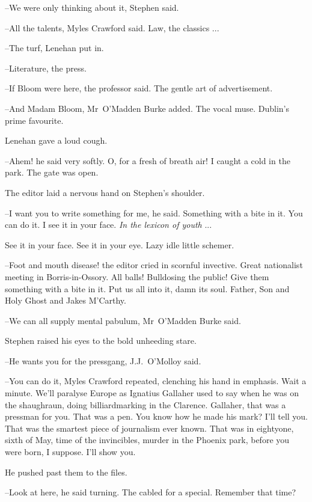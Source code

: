 --We were only thinking about it,
Stephen said.

--All the talents,
Myles Crawford said.
Law,
the classics ...

--The turf,
Lenehan put in.

--Literature,
the press.

--If Bloom were here,
the professor said.
The gentle art of advertisement.

--And Madam Bloom,
Mr~O'Madden Burke added.
The vocal muse.
Dublin's prime favourite.

Lenehan gave a loud cough.

--Ahem!
he said very softly.
O, for a fresh of breath air!
I caught a cold in the park.
The gate was open.



The editor laid a nervous hand on Stephen's shoulder.

--I want you to write something for me,
he said.
Something with a bite in it.
You can do it.
I see it in your face.
\emph{In the lexicon of youth} ...

See it in your face.
See it in your eye.
Lazy idle little schemer.

--Foot and mouth disease!
the editor cried in scornful invective.
Great nationalist meeting in Borris-in-Ossory.
All balls!
Bulldosing the public!
Give them something with a bite in it.
Put us all into it,
damn its soul.
Father, Son and Holy Ghost
and Jakes M'Carthy.

--We can all supply mental pabulum,
Mr~O'Madden Burke said.

Stephen raised his eyes to the bold unheeding stare.

--He wants you for the pressgang,
J.J.~O'Molloy said.



--You can do it,
Myles Crawford repeated,
clenching his hand in emphasis.
Wait a minute.
We'll paralyse Europe as Ignatius Gallaher used to say
when he was on the shaughraun,
doing billiardmarking in the Clarence.
Gallaher, that was a pressman for you.
That was a pen.
You know how he made his mark?
I'll tell you.
That was the smartest piece of journalism ever known.
That was in eightyone, sixth of May,
time of the invincibles,
murder in the Phoenix park,
before you were born, I suppose.
I'll show you.

He pushed past them to the files.

--Look at here,
he said turning.
The  cabled for a special.
Remember that time?

